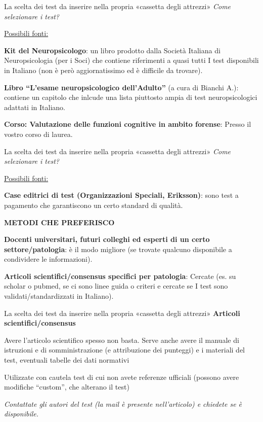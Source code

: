 \documentclass[
  ignorenonframetext,
]{beamer}
\begin{document}
\begin{frame}{La scelta dei test da inserire nella propria «cassetta
degli attrezzi»}
\label{la-scelta-dei-test-da-inserire-nella-propria-cassetta-degli-attrezzi-1}
\emph{Come selezionare i test?}

\underline{Possibili fonti:}

\textbf{Kit del Neuropsicologo}: un libro prodotto dalla Società
Italiana di Neuropsicologia (per i Soci) che contiene riferimenti a
quasi tutti I test disponibili in Italiano (non è però aggiornatissimo
ed è difficile da trovare).

\textbf{Libro ``L'esame neuropsicologico dell'Adulto''} (a cura di
Bianchi A.): contiene un capitolo che inlcude una lista piuttosto ampia
di test neuropsicologici adattati in Italiano.

\textbf{Corso: Valutazione delle funzioni cognitive in ambito forense}:
Presso il vostro corso di laurea.
\end{frame}

\begin{frame}{La scelta dei test da inserire nella propria «cassetta
degli attrezzi»}
\label{la-scelta-dei-test-da-inserire-nella-propria-cassetta-degli-attrezzi-2}
\emph{Come selezionare i test?}

\underline{Possibili fonti:}

\textbf{Case editrici di test (Organizzazioni Speciali, Eriksson)}: sono
test a pagamento che garantiscono un certo standard di qualità.

\begin{center}
  \textbf{METODI CHE PREFERISCO}
\end{center}

\textbf{Docenti universitari, futuri colleghi ed esperti di un certo
settore/patologia}: è il modo migliore (se trovate qualcuno disponibile
a condividere le informazioni).

\textbf{Articoli scientifici/consensus specifici per patologia}: Cercate
(es. su scholar o pubmed, se ci sono linee guida o criteri e cercate se
I test sono validati/standardizzati in Italiano).
\end{frame}

\begin{frame}{La scelta dei test da inserire nella propria «cassetta
degli attrezzi»}
\label{la-scelta-dei-test-da-inserire-nella-propria-cassetta-degli-attrezzi-3}
\textbf{Articoli scientifici/consensus}

Avere l'articolo scientifico spesso non basta. Serve anche avere il
manuale di istruzioni e di somministrazione (e attribuzione dei
punteggi) e i materiali del test, eventuali tabelle dei dati normativi

Utilizzate con cautela test di cui non avete referenze ufficiali
(possono avere modifiche ``custom'', che alterano il test)

\emph{Contattate gli autori del test (la mail è presente nell'articolo)
e chiedete se è disponibile.}
\end{frame}
\end{document}
